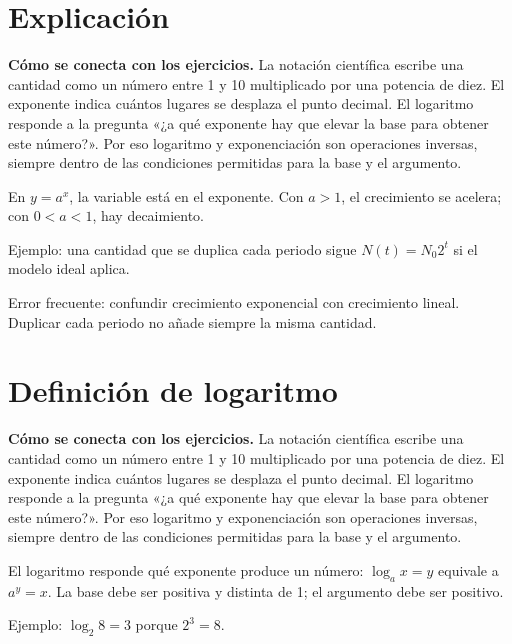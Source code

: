 \documentclass[10pt,oneside,openany]{book}
\begin{document}
\section{Explicación}

\textbf{Cómo se conecta con los ejercicios.} La notación científica escribe una cantidad como un número entre 1 y 10 multiplicado por una potencia de diez. El exponente indica cuántos lugares se desplaza el punto decimal. El logaritmo responde a la pregunta «¿a qué exponente hay que elevar la base para obtener este número?». Por eso logaritmo y exponenciación son operaciones inversas, siempre dentro de las condiciones permitidas para la base y el argumento.

En $y=a^x$, la variable está en el exponente. Con $a>1$, el crecimiento se acelera; con $0<a<1$, hay decaimiento.



\begin{ejemplo}
Ejemplo: una cantidad que se duplica cada periodo sigue $N(t)=N_0 2^t$ si el modelo ideal aplica.
\end{ejemplo}

\begin{ojo}
Error frecuente: confundir crecimiento exponencial con crecimiento lineal. Duplicar cada periodo no añade siempre la misma cantidad.
\end{ojo}



\section{Definición de logaritmo}

\textbf{Cómo se conecta con los ejercicios.} La notación científica escribe una cantidad como un número entre 1 y 10 multiplicado por una potencia de diez. El exponente indica cuántos lugares se desplaza el punto decimal. El logaritmo responde a la pregunta «¿a qué exponente hay que elevar la base para obtener este número?». Por eso logaritmo y exponenciación son operaciones inversas, siempre dentro de las condiciones permitidas para la base y el argumento.

El logaritmo responde qué exponente produce un número: $\log_a x=y$ equivale a $a^y=x$. La base debe ser positiva y distinta de 1; el argumento debe ser positivo.

\begin{ejemplo}
Ejemplo: $\log_2 8=3$ porque $2^3=8$.
\end{ejemplo}
\end{document}
